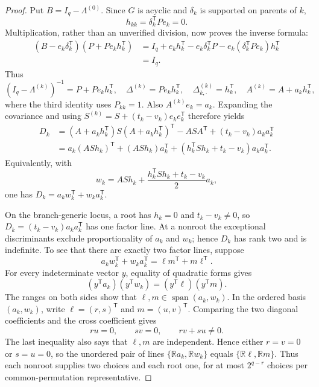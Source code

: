 \documentclass{article}
\begin{document}
\begin{proof}
Put \(B=I_q-\Lambda^{(0)}\).  Since \(G\) is acyclic and \(\delta_k\) is supported on parents of \(k\),
\[
 h_{kk}=\delta_k^{\mathsf T}Pe_k=0.
\]
Multiplication, rather than an unverified division, now proves the inverse formula:
\[
 \begin{aligned}
 (B-e_k\delta_k^{\mathsf T})(P+Pe_kh_k^{\mathsf T})
 &=I_q+e_kh_k^{\mathsf T}-e_k\delta_k^{\mathsf T}P
   -e_k(\delta_k^{\mathsf T}Pe_k)h_k^{\mathsf T}\\
 &=I_q.
 \end{aligned}
\]
Thus
\[
 (I_q-\Lambda^{(k)})^{-1}=P+Pe_kh_k^{\mathsf T},
 \quad
 \Delta^{(k)}=Pe_kh_k^{\mathsf T},
 \quad
 \Delta^{(k)}_{k,\cdot}=h_k^{\mathsf T},
 \quad
 A^{(k)}=A+a_kh_k^{\mathsf T},
\]
where the third identity uses \(P_{kk}=1\).  Also \(A^{(k)}e_k=a_k\).  Expanding the covariance and using \(S^{(k)}=S+(t_k-v_k)e_ke_k^{\mathsf T}\) therefore yields
\[
 \begin{aligned}
 D_k
 &=(A+a_kh_k^{\mathsf T})S(A+a_kh_k^{\mathsf T})^{\mathsf T}-ASA^{\mathsf T}
 +(t_k-v_k)a_ka_k^{\mathsf T}\\
 &=a_k(ASh_k)^{\mathsf T}+(ASh_k)a_k^{\mathsf T}
 +(h_k^{\mathsf T}Sh_k+t_k-v_k)a_ka_k^{\mathsf T}.
 \end{aligned}
\]
Equivalently, with
\[
 w_k=ASh_k+\frac{h_k^{\mathsf T}Sh_k+t_k-v_k}{2}a_k,
\]
one has \(D_k=a_kw_k^{\mathsf T}+w_ka_k^{\mathsf T}\).

On the branch-generic locus, a root has \(h_k=0\) and \(t_k-v_k\ne0\), so \(D_k=(t_k-v_k)a_ka_k^{\mathsf T}\) has one factor line.  At a nonroot the exceptional discriminants exclude proportionality of \(a_k\) and \(w_k\); hence \(D_k\) has rank two and is indefinite.  To see that there are exactly two factor lines, suppose
\[
 a_kw_k^{\mathsf T}+w_ka_k^{\mathsf T}
 =\ell m^{\mathsf T}+m\ell^{\mathsf T}.
\]
For every indeterminate vector \(y\), equality of quadratic forms gives
\[
 (y^{\mathsf T}a_k)(y^{\mathsf T}w_k)
 =(y^{\mathsf T}\ell)(y^{\mathsf T}m).
\]
The ranges on both sides show that \(\ell,m\in\operatorname{span}(a_k,w_k)\).  In the ordered basis \((a_k,w_k)\), write \(\ell=(r,s)^{\mathsf T}\) and \(m=(u,v)^{\mathsf T}\).  Comparing the two diagonal coefficients and the cross coefficient gives
\[
 ru=0,\qquad sv=0,\qquad rv+su\ne0.
\]
The last inequality also says that \(\ell,m\) are independent.  Hence either \(r=v=0\) or \(s=u=0\), so the unordered pair of lines \(\{\mathbb Ra_k,\mathbb Rw_k\}\) equals \(\{\mathbb R\ell,\mathbb Rm\}\).  Thus each nonroot supplies two choices and each root one, for at most \(2^{q-r}\) choices per common-permutation representative.


\end{proof}
\end{document}
